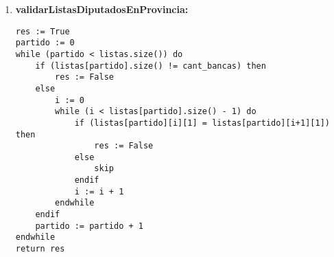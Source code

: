 \documentclass[10pt,a4paper]{article}
\begin{document}
\begin{enumerate}
\newpage


\addtocounter{enumi}{2}
\item \textbf{validarListasDiputadosEnProvincia:}
\begin{lstlisting}
res := True
partido := 0
while (partido < listas.size()) do
    if (listas[partido].size() != cant_bancas) then
        res := False
    else
        i := 0
        while (i < listas[partido].size() - 1) do
            if (listas[partido][i][1] = listas[partido][i+1][1]) then
                res := False
            else 
                skip
            endif
            i := i + 1
        endwhile
    endif
    partido := partido + 1
endwhile
return res
\end{lstlisting}
\end{enumerate}
\end{document}
